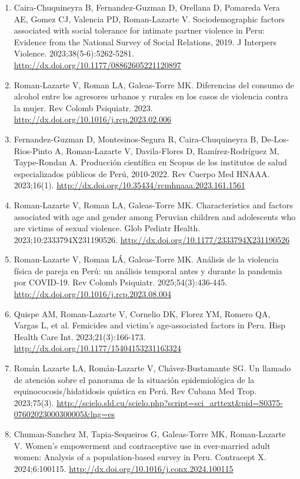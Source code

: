 \documentclass[11pt,a4paper]{article}
\begin{document}
\begin{enumerate}[leftmargin=*]
\item Caira-Chuquineyra B, Fernandez-Guzman D, Orellana D, Pomareda Vera AE, Gomez CJ, Valencia PD, Roman-Lazarte V. Sociodemographic factors associated with social tolerance for intimate partner violence in Peru: Evidence from the National Survey of Social Relations, 2019. J Interpers Violence. 2023;38(5-6):5262-5281. \url{http://dx.doi.org/10.1177/08862605221120897}
\item Roman-Lazarte V, Roman LA, Galeas-Torre MK. Diferencias del consumo de alcohol entre los agresores urbanos y rurales en los casos de violencia contra la mujer. Rev Colomb Psiquiatr. 2023. \url{http://dx.doi.org/10.1016/j.rcp.2023.02.006}
\item Fernandez-Guzman D, Montesinos-Segura R, Caira-Chuquineyra B, De-Los-Rios-Pinto A, Roman-Lazarte V, Davila-Flores D, Ramírez-Rodríguez M, Taype-Rondan A. Producción científica en Scopus de los institutos de salud especializados públicos de Perú, 2010-2022. Rev Cuerpo Med HNAAA. 2023;16(1). \url{http://dx.doi.org/10.35434/rcmhnaaa.2023.161.1561}
\item Roman-Lazarte V, Roman LA, Galeas-Torre MK. Characteristics and factors associated with age and gender among Peruvian children and adolescents who are victims of sexual violence. Glob Pediatr Health. 2023;10:2333794X231190526. \url{http://dx.doi.org/10.1177/2333794X231190526}
\item Roman-Lazarte V, Roman LÁ, Galeas-Torre MK. Análisis de la violencia física de pareja en Perú: un análisis temporal antes y durante la pandemia por COVID-19. Rev Colomb Psiquiatr. 2025;54(3):436-445. \url{http://dx.doi.org/10.1016/j.rcp.2023.08.004}
\item Quispe AM, Roman-Lazarte V, Cornelio DK, Florez YM, Romero QA, Vargas L, et al. Femicides and victim's age-associated factors in Peru. Hisp Health Care Int. 2023;21(3):166-173. \url{http://dx.doi.org/10.1177/15404153231163324}
\item Román Lazarte LA, Román-Lazarte V, Chávez-Bustamante SG. Un llamado de atención sobre el panorama de la situación epidemiológica de la equinococosis/hidatidosis quística en Perú. Rev Cubana Med Trop. 2023;75(3). \url{http://scielo.sld.cu/scielo.php?script=sci_arttext&pid=S0375-07602023000300005&lng=es}
\item Chuman-Sanchez M, Tapia-Sequeiros G, Galeas-Torre MK, Roman-Lazarte V. Women's empowerment and contraceptive use in ever-married adult women: Analysis of a population-based survey in Peru. Contracept X. 2024;6:100115. \url{http://dx.doi.org/10.1016/j.conx.2024.100115}

\end{enumerate}
\end{document}
